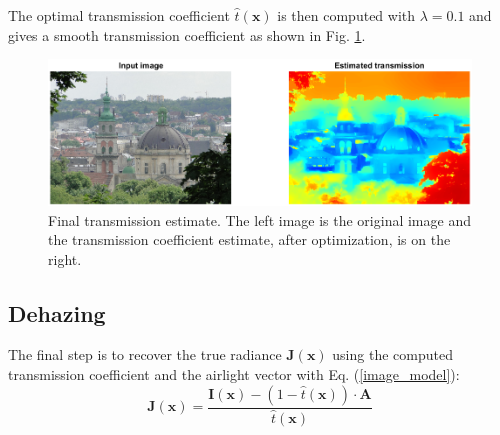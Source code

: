 \documentclass[conference]{IEEEtran}
\begin{document}
The optimal transmission coefficient $\hat{t}(\mathbf{x})$ is then computed with $\lambda = 0.1$ and gives a smooth transmission coefficient as shown in Fig. \ref{fig:final_transmission}. 
\begin{figure}
    \centering
    \includegraphics[width=\linewidth]{img/opti.png}
    \caption{Final transmission estimate.  The left image is the original image and the transmission coefficient estimate, after optimization, is on the right.}
    \label{fig:final_transmission}
\end{figure}

\subsection{Dehazing}
The final step is to recover the true radiance $\mathbf{J}(\mathbf{x})$ using the computed transmission coefficient and the airlight vector with Eq. (\ref{image_model}):
\begin{equation}
    \mathbf{J}(\mathbf{x}) = \frac{\mathbf{I}(\mathbf{x}) - (1 - \hat{t}(\mathbf{x})) \cdot \mathbf{A}}{\hat{t}(\mathbf{x})}
\end{equation}
\end{document}
